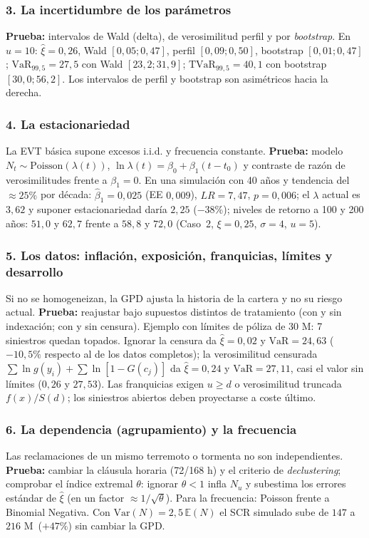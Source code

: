 \documentclass[a4paper,12pt]{article}
\newcommand{\euro}{\texteuro}
\newcommand{\E}{\mathbb{E}}
\newcommand{\Var}{\mathrm{Var}}
\newcommand{\VaR}{\mathrm{VaR}}
\newcommand{\TVaR}{\mathrm{TVaR}}
\begin{document}
\subsubsection*{3. La incertidumbre de los par\'ametros}
\textbf{Prueba:} intervalos de Wald (delta), de verosimilitud perfil y por \emph{bootstrap}. En $u=10$: $\hat\xi=0{,}26$, Wald $[0{,}05;0{,}47]$, perfil $[0{,}09;0{,}50]$, bootstrap $[0{,}01;0{,}47]$; $\VaR_{99,5}=27{,}5$ con Wald $[23{,}2;31{,}9]$; $\TVaR_{99,5}=40{,}1$ con bootstrap $[30{,}0;56{,}2]$. Los intervalos de perfil y bootstrap son asim\'etricos hacia la derecha.

\subsubsection*{4. La estacionariedad}
La EVT b\'asica supone excesos i.i.d. y frecuencia constante. \textbf{Prueba:} modelo $N_t\sim\text{Poisson}(\lambda(t))$, $\ln\lambda(t)=\beta_0+\beta_1(t-t_0)$ y contraste de raz\'on de verosimilitudes frente a $\beta_1=0$. En una simulaci\'on con 40 a\~nos y tendencia del $\approx25\%$ por d\'ecada: $\hat\beta_1=0{,}025$ (EE $0{,}009$), $LR=7{,}47$, $p=0{,}006$; el $\lambda$ actual es $3{,}62$ y suponer estacionariedad dar\'ia $2{,}25$ ($-38\%$); niveles de retorno a 100 y 200 a\~nos: $51{,}0$ y $62{,}7$ frente a $58{,}8$ y $72{,}0$ (Caso~2, $\xi=0{,}25$, $\sigma=4$, $u=5$).

\subsubsection*{5. Los datos: inflaci\'on, exposici\'on, franquicias, l\'imites y desarrollo}
Si no se homogeneizan, la GPD ajusta la historia de la cartera y no su riesgo actual. \textbf{Prueba:} reajustar bajo supuestos distintos de tratamiento (con y sin indexaci\'on; con y sin censura). Ejemplo con l\'imites de p\'oliza de 30 M\euro: 7 siniestros quedan topados. Ignorar la censura da $\hat\xi=0{,}02$ y $\VaR=24{,}63$ ($-10{,}5\%$ respecto al de los datos completos); la verosimilitud censurada $\sum\ln g(y_i)+\sum\ln[1-G(c_j)]$ da $\hat\xi=0{,}24$ y $\VaR=27{,}11$, casi el valor sin l\'imites ($0{,}26$ y $27{,}53$). Las franquicias exigen $u\ge d$ o verosimilitud truncada $f(x)/S(d)$; los siniestros abiertos deben proyectarse a coste \'ultimo.

\subsubsection*{6. La dependencia (agrupamiento) y la frecuencia}
Las reclamaciones de un mismo terremoto o tormenta no son independientes. \textbf{Prueba:} cambiar la cl\'ausula horaria (72/168 h) y el criterio de \emph{declustering}; comprobar el \'indice extremal $\theta$: ignorar $\theta<1$ infla $N_u$ y subestima los errores est\'andar de $\hat\xi$ (en un factor $\approx1/\sqrt\theta$). Para la frecuencia: Poisson frente a Binomial Negativa. Con $\Var(N)=2{,}5\,\E(N)$ el SCR simulado sube de $147$ a $216$ M\euro\ ($+47\%$) sin cambiar la GPD.
\end{document}
